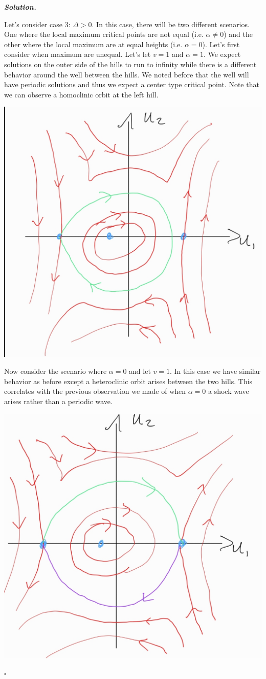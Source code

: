 \documentclass[12pt]{report}
\newenvironment{solution}[1][\it{Solution}]{\textbf{#1. } }{$\square$}
\begin{document}
\begin{solution}
\begin{enumerate}
        \noindent 
        Let's consider case 3: $\Delta > 0$. In this case, there will be two different scenarios. One where the local maximum critical points are not equal (i.e. $\alpha \neq 0$) and the other where the local maximum are at equal heights (i.e. $\alpha = 0$). Let's first consider when maximum are unequal. Let's let $v=1$ and $\alpha = 1$. We expect solutions on the outer side of the hills to run to infinity while there is a different behavior around the well between the hills. We noted before that the well will have periodic solutions and thus we expect a center type critical point. Note that we can observe a homoclinic orbit at the left hill. 

        \begin{center}
            \includegraphics[width=.6\textwidth]{plots/4b-phase3.jpg}
        \end{center}

        Now consider the scenario where $\alpha =0$ and let $v=1$. In this case we have similar behavior as before except a heteroclinic orbit arises between the two hills. This correlates with the previous observation we made of when $\alpha = 0$ a shock wave arises rather than a periodic wave.  
        
        \begin{center}
            \includegraphics[width=.6\textwidth]{plots/4b-phase4.jpg}
        \end{center}


\end{enumerate}
\end{solution}
\end{document}
